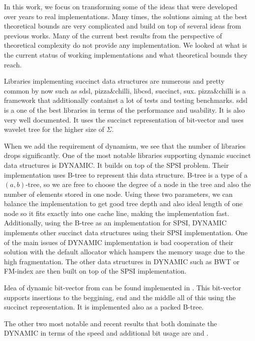 In this work, we focus on transforming some of the ideas that were developed over years to real implementations. Many times, the solutions aiming at the best theoretical bounds are very complicated and build on top of several ideas from previous works. Many of the current best results from the perspective of theoretical complexity do not provide any implementation. We looked at what is the current status of working implementations and what theoretical bounds they reach.

Libraries implementing succinct data structures are numerous and pretty common by now such as sdsl\cite{gog2014theory}, pizza\&chilli\cite{pizza-chilli}, libcsd\cite{brisaboa2011compressed}, succinct\cite{succinct}, sux\cite{sux}. pizza\&chilli is a framework that additionally containst a lot of tests and testing benchmarks. sdsl is a one of the best libraries in terms of the performance and usability. It is also very well documented. It uses the succinct representation of bit-vector and uses wavelet tree for the higher size of $\Sigma$.

When we add the requirement of dynamism, we see that the number of libraries drops significantly. One of the most notable libraries supporting 
dynamic succinct data structures is DYNAMIC. It builds on top of the SPSI problem. Their implementation uses B-tree to represent this data structure. B-tree is a type of a $(a, b)$-tree, so we are free to choose the degree of a node in the tree and also the number of elements stored in one node. Using these two parameters, we can balance the implementation to get good tree depth and also ideal length of one node so it fits exactly into one cache line, making the implementation fast. Additionally, using the B-tree as an implementation for SPSI, DYNAMIC implements other succinct
data structures using their SPSI implementation. One of the main issues of DYNAMIC implementation is bad cooperation of their solution with the default allocator which hampers the memory usage due to the high fragmentation. The other data structures in DYNAMIC such as BWT or FM-index are then built on top of the SPSI implementation.

Idea of dynamic bit-vector from \cite{policriti2015average} can be found implemented in \cite{ds-bitvector}. This bit-vector supports insertions to the beggining, end and the middle all of this using the succinct representation. It is implemented also as a packed B-tree.

The other two most notable and recent results that both dominate the DYNAMIC in terms of the speed and additional bit usage are \cite{marchini2020compact} and \cite{pibiri2020rank}.

